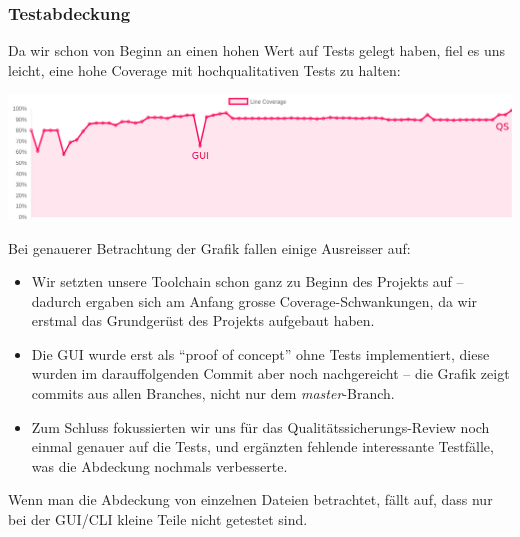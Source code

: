\documentclass[a4paper]{article}
\begin{document}
\subsubsection{Testabdeckung}

Da wir schon von Beginn an einen hohen Wert auf Tests gelegt haben, fiel es uns
leicht, eine hohe Coverage mit hochqualitativen Tests zu halten:

\includegraphics[width=\linewidth]{img/coverage.png}

Bei genauerer Betrachtung der Grafik fallen einige Ausreisser auf:

\begin{itemize}
  \item Wir setzten unsere Toolchain schon ganz zu Beginn des Projekts auf --
    dadurch ergaben sich am Anfang grosse Coverage-Schwankungen, da wir erstmal
    das Grundgerüst des Projekts aufgebaut haben.
  \item Die GUI wurde erst als ``proof of concept'' ohne Tests implementiert,
    diese wurden im darauffolgenden Commit aber noch nachgereicht -- die Grafik
    zeigt commits aus allen Branches, nicht nur dem \emph{master}-Branch.
  \item Zum Schluss fokussierten wir uns für das Qualitätssicherungs-Review noch
    einmal genauer auf die Tests, und ergänzten fehlende interessante Testfälle,
    was die Abdeckung nochmals verbesserte.
\end{itemize}

Wenn man die Abdeckung von einzelnen Dateien betrachtet, fällt auf, dass nur bei
der GUI/CLI kleine Teile nicht getestet sind.
\end{document}
